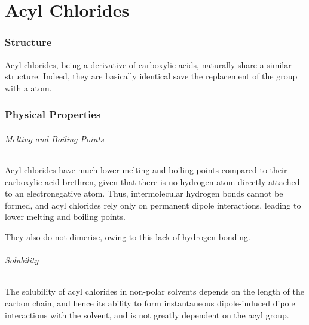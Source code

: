 

\pagebreak
\hypertarget{ChapterAcylChlorides}{}
\part{Acyl Chlorides}

	\section{Structure}

		Acyl chlorides, being a derivative of carboxylic acids, naturally share a similar structure. Indeed, they are basically identical
		save the replacement of the  group with a \ch{\chlorine} atom.





	\section{Physical Properties}

		\paragraph{Melting and Boiling Points}

		Acyl chlorides have much lower melting and boiling points compared to their carboxylic acid brethren, given that there is no hydrogen
		atom directly attached to an electronegative atom. Thus, intermolecular hydrogen bonds cannot be formed, and acyl chlorides rely only
		on permanent dipole interactions, leading to lower melting and boiling points.

		They also do not dimerise, owing to this lack of hydrogen bonding.


		\paragraph{Solubility}

		The solubility of acyl chlorides in non-polar solvents depends on the length of the carbon chain, and hence its ability to form
		instantaneous dipole-induced dipole interactions with the solvent, and is not greatly dependent on the acyl group.

